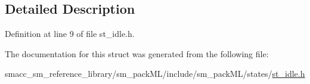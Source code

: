 \subsection{Detailed Description}


Definition at line 9 of file st\+\_\+idle.\+h.



The documentation for this struct was generated from the following file\+:\begin{DoxyCompactItemize}
\item 
smacc\+\_\+sm\+\_\+reference\+\_\+library/sm\+\_\+pack\+M\+L/include/sm\+\_\+pack\+M\+L/states/\hyperlink{sm__packML_2include_2sm__packML_2states_2st__idle_8h}{st\+\_\+idle.\+h}\end{DoxyCompactItemize}
